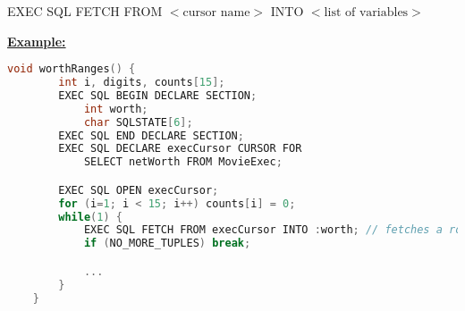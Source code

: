 \documentclass[12pt]{article}
\begin{document}
\begin{enumerate}[1.]
\begin{itemize}
\begin{itemize}
            EXEC SQL FETCH FROM $<\text{cursor name}>$ INTO $<\text{list of variables}>$

            \bigskip

            \underline{\textbf{Example:}}

            \bigskip

    \begin{lstlisting}[language=c]
    void worthRanges() {
        int i, digits, counts[15];
        EXEC SQL BEGIN DECLARE SECTION;
            int worth;
            char SQLSTATE[6];
        EXEC SQL END DECLARE SECTION;
        EXEC SQL DECLARE execCursor CURSOR FOR
            SELECT netWorth FROM MovieExec;

        EXEC SQL OPEN execCursor;
        for (i=1; i < 15; i++) counts[i] = 0;
        while(1) {
            EXEC SQL FETCH FROM execCursor INTO :worth; // fetches a row of value from movieExec and stores in worth
            if (NO_MORE_TUPLES) break;

            ...
        }
    }
    \end{lstlisting}

        \end{itemize}
    \end{itemize}
\end{enumerate}
\end{document}
